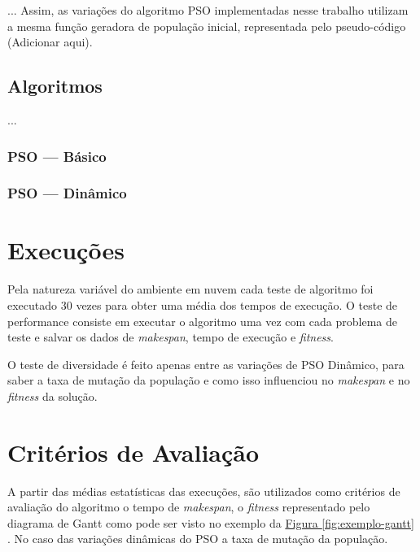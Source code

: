         

        ...
        Assim, as variações do algoritmo PSO implementadas nesse trabalho utilizam a mesma função geradora de população inicial, representada pelo pseudo-código   (Adicionar aqui).


    \subsection{Algoritmos}
            ...

        \subsubsection{PSO — Básico}

        \subsubsection{PSO — Dinâmico}

    



\section{Execuções}
    Pela natureza variável do ambiente em nuvem cada teste de algoritmo foi executado 30 vezes para obter uma média dos tempos de execução. O teste de performance consiste em executar o algoritmo uma vez com cada problema de teste e salvar os dados de \textit{makespan}, tempo de execução e \textit{fitness}.

    O teste de diversidade é feito apenas entre as variações de PSO Dinâmico, para saber a taxa de mutação da população e como isso influenciou no \textit{makespan} e no \textit{fitness} da solução.


\section{Critérios de Avaliação}
    A partir das médias estatísticas das execuções, são utilizados como critérios de avaliação do algoritmo o tempo de \textit{makespan}, o \textit{fitness} representado pelo diagrama de Gantt como pode ser visto no exemplo da 
    \hyperref[fig:exemplo-gantt]{Figura \ref{fig:exemplo-gantt}}
    . No caso das variações dinâmicas do PSO a taxa de mutação da população.

